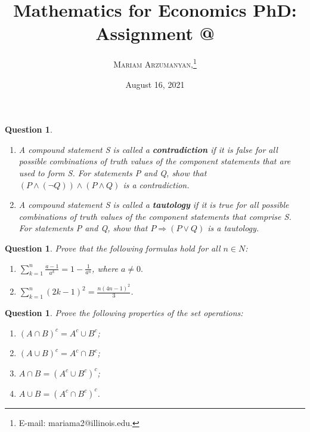 \documentclass[12pt]{article}
\makeatletter
\newtheorem{ques}[theorem]{Question}
\newcommand*{\rom}[1]{\expandafter\@slowromancap\romannumeral #1@}
\makeatother
\begin{document}
\setcounter{footnote}{0}
\title{Mathematics for Economics PhD: Assignment \rom{1}}
\author{\textsc{Mariam Arzumanyan,}\thanks {   E-mail: mariama2@illinois.edu.} \\ } 


\date{August 16, 2021}


\maketitle 

\begin{ques}
\begin{enumerate}
    \item A compound statement S is called a \textbf{contradiction} if it is false for all possible combinations of truth values of the component statements that are used to form S. For statements P and
Q, show that $(P \land (\neg Q)) \land (P \land Q)$ is a contradiction.
 \item A compound statement S is called a \textbf{tautology} if it is true for all possible combinations of
truth values of the component statements that comprise S. For statements P and Q, show
that $P \Rightarrow (P \lor Q)$ is a tautology.

\end{enumerate}
\end{ques}
\newpage

\begin{ques}
Prove that the following formulas hold for all $n \in N$:
\begin{enumerate}
    \item $\sum_{k=1}^n\frac{a-1}{a^k}=1-\frac{1}{a^n}$, where $a\neq 0.$
    \item $\sum_{k=1}^n(2k-1)^2=\frac{n(4n-1)^2}{3}$.
\end{enumerate}
\end{ques}

\newpage
\begin{ques}
 Prove the following properties of the set operations:
    \begin{enumerate}
        \item $(A\cap B)^c=A^c\cup B^c$;
         \item $(A\cup B)^c=A^c\cap B^c$;
          \item $A\cap B=(A^c\cup B^c)^c$;
          \item $A\cup B=(A^c\cap B^c)^c$.
    \end{enumerate}
\end{ques}
\end{document}
